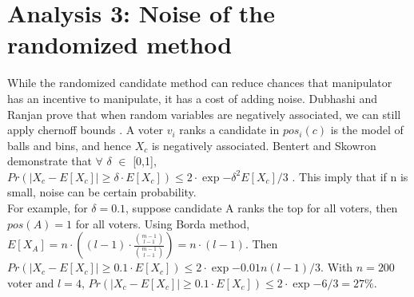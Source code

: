 \documentclass[letterpaper]{article} %
\begin{document}


\section{Analysis 3: Noise of the randomized method}
While the randomized candidate method can reduce chances that manipulator has an incentive to manipulate, it has a cost of adding noise. Dubhashi and Ranjan prove that when random variables are negatively associated, we can still apply chernoff bounds \cite{BRICS}. A voter $v_i$ ranks a candidate in $pos_i(c)$ is the model of balls and bins, and hence $X_c$ is negatively associated. Bentert and Skowron demonstrate that $\forall$ $\delta$ $\in$ [0,1], $Pr(|X_c-E[X_c]| \geq \delta\cdot E[X_c]) \leq 2\cdot\exp{-\delta^2E[X_c]/3} $ \cite{Skowron}. This imply that if n is small, noise can be certain probability. \\
For example, for $\delta = 0.1$,  suppose candidate A ranks the top for all voters, then $pos(A) = 1$ for all voters. Using Borda method, $E[X_A]=n\cdot((l-1)\cdot \frac{\binom{m-1}{l-1}}{\binom{m-1}{l-1}}) = n\cdot(l-1).$ Then $Pr(|X_c-E[X_c]| \geq 0.1\cdot E[X_c]) \leq 2\cdot\exp{-0.01n(l-1)/3} $.
With $n=200$ voter and $l=4$, $Pr(|X_c-E[X_c]| \geq 0.1\cdot E[X_c]) \leq 2\cdot\exp{-6/3} = 27\%$.
\end{document}

